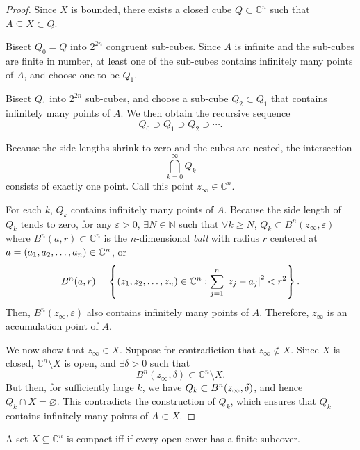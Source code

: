 \begin{proof}
    Since \(X\) is bounded, there exists a closed cube \(Q\subset\mathbb{C}^n\) such that \(A\subseteq X\subset Q\).

    Bisect \(Q_0=Q\) into \(2^{2n}\) congruent sub-cubes. Since \(A\) is infinite and the sub-cubes are finite in number, at least one of the sub-cubes contains infinitely many points of \(A\), and choose one to be \(Q_1\).

    Bisect \(Q_1\) into \(2^{2n}\) sub-cubes, and choose a sub-cube \(Q_2\subset Q_1\) that contains infinitely many points of \(A\). We then obtain the recursive sequence \[Q_0\supset Q_1\supset Q_2\supset\cdots.\]

    Because the side lengths shrink to zero and the cubes are nested, the intersection
    \[\bigcap_{k=0}^{\infty}Q_k\]
    consists of exactly one point. Call this point \(z_\infty\in\mathbb{C}^n\).

    For each \(k\), \(Q_k\) contains infinitely many points of \(A\). Because the side length of \(Q_k\) tends to zero, for any \(\varepsilon>0\), \(\exists N\in\mathbb{N}\) such that \(\forall k\geq N\), \(Q_k\subset B^n(z_\infty,\varepsilon)\) where \(B^n(a,r)\subset\mathbb{C}^n\) is the \(n\)-dimensional \textit{ball} with radius \(r\) centered at \(a=\qty(a_1,a_2,\ldots,a_n)\in\mathbb{C}^n\), or \[B^n(a,r)=\cbraces{\qty(z_1,z_2,\ldots,z_n)\in\mathbb{C}^n}{\sum_{j=1}^n\abs{z_j-a_j}^2<r^2}.\]
    Then, \(B^n(z_\infty, \varepsilon)\) also contains infinitely many points of \(A\). Therefore, \(z_\infty\) is an accumulation point of \(A\).

    We now show that \(z_\infty\in X\). Suppose for contradiction that \(z_\infty\notin X\). Since \(X\) is closed, \(\mathbb{C}^n\setminus X\) is open, and \(\exists\delta>0\) such that \[B^n(z_\infty,\delta)\subset\mathbb{C}^n\setminus X.\]
    But then, for sufficiently large \(k\), we have \(Q_k \subset B^n\qty(z_\infty,\delta)\), and hence \(Q_k\cap X=\varnothing\). This contradicts the construction of \(Q_k\), which ensures that \(Q_k\) contains infinitely many points of \(A \subset X\).
\end{proof}
\begin{theorem}\label{thm:heineborel}
    A set \(X\subseteq\mathbb{C}^n\) is compact iff if every open cover has a finite subcover.
\end{theorem}
